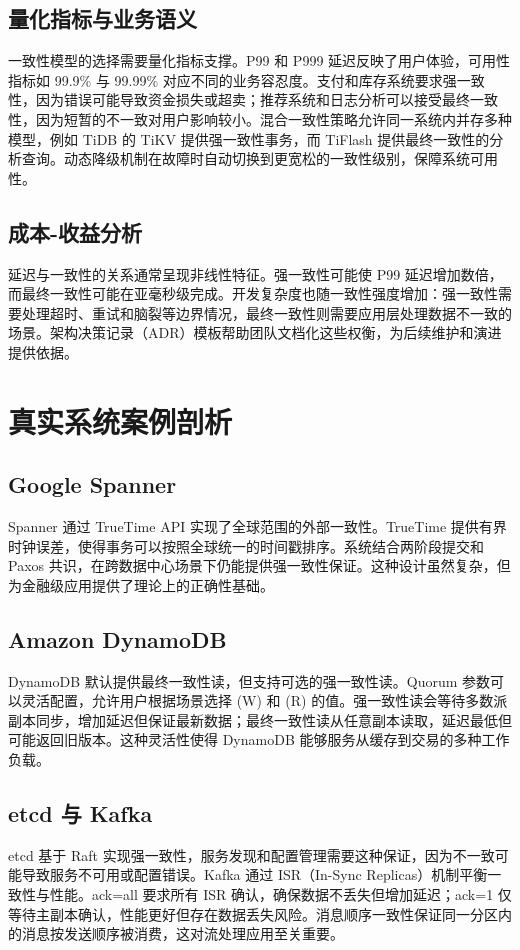 \section{量化指标与业务语义}
一致性模型的选择需要量化指标支撑。P99 和 P999 延迟反映了用户体验，可用性指标如 99.9\%{} 与 99.99\%{} 对应不同的业务容忍度。支付和库存系统要求强一致性，因为错误可能导致资金损失或超卖；推荐系统和日志分析可以接受最终一致性，因为短暂的不一致对用户影响较小。混合一致性策略允许同一系统内并存多种模型，例如 TiDB 的 TiKV 提供强一致性事务，而 TiFlash 提供最终一致性的分析查询。动态降级机制在故障时自动切换到更宽松的一致性级别，保障系统可用性。\par
\section{成本-收益分析}
延迟与一致性的关系通常呈现非线性特征。强一致性可能使 P99 延迟增加数倍，而最终一致性可能在亚毫秒级完成。开发复杂度也随一致性强度增加：强一致性需要处理超时、重试和脑裂等边界情况，最终一致性则需要应用层处理数据不一致的场景。架构决策记录（ADR）模板帮助团队文档化这些权衡，为后续维护和演进提供依据。\par
\chapter{真实系统案例剖析}
\section{Google Spanner}
Spanner 通过 TrueTime API 实现了全球范围的外部一致性。TrueTime 提供有界时钟误差，使得事务可以按照全球统一的时间戳排序。系统结合两阶段提交和 Paxos 共识，在跨数据中心场景下仍能提供强一致性保证。这种设计虽然复杂，但为金融级应用提供了理论上的正确性基础。\par
\section{Amazon DynamoDB}
DynamoDB 默认提供最终一致性读，但支持可选的强一致性读。Quorum 参数可以灵活配置，允许用户根据场景选择 (W) 和 (R) 的值。强一致性读会等待多数派副本同步，增加延迟但保证最新数据；最终一致性读从任意副本读取，延迟最低但可能返回旧版本。这种灵活性使得 DynamoDB 能够服务从缓存到交易的多种工作负载。\par
\section{etcd 与 Kafka}
etcd 基于 Raft 实现强一致性，服务发现和配置管理需要这种保证，因为不一致可能导致服务不可用或配置错误。Kafka 通过 ISR（In-Sync Replicas）机制平衡一致性与性能。ack=all 要求所有 ISR 确认，确保数据不丢失但增加延迟；ack=1 仅等待主副本确认，性能更好但存在数据丢失风险。消息顺序一致性保证同一分区内的消息按发送顺序被消费，这对流处理应用至关重要。\par
